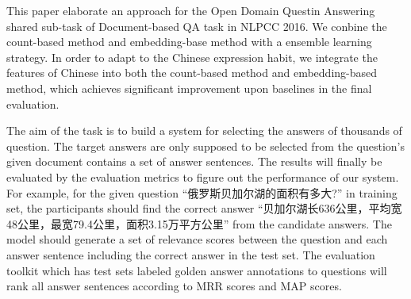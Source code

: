 \documentclass{llncs}
\begin{document}
This paper elaborate an approach for the Open Domain Questin Answering shared sub-task of Document-based QA task in NLPCC 2016. We conbine the count-based method and embedding-base method with a ensemble learning strategy. In order to adapt to the Chinese expression habit, we integrate the features of Chinese into both the count-based method and embedding-based method, which achieves significant improvement upon baselines in the final evaluation.









The aim of the task is to build a system for selecting the answers of thousands of question. The target answers are only supposed to be selected from the question's given document contains a set of answer sentences. 
The results will finally be evaluated by the evaluation metrics to figure out the performance of our system. 
For example, for the given question ``俄罗斯贝加尔湖的面积有多大?'' in training set, the participants should find the correct answer ``贝加尔湖长636公里，平均宽48公里，最宽79.4公里，面积3.15万平方公里'' from the candidate answers. The model should generate a set of relevance scores between the question and each answer sentence including the correct answer in the test set. The evaluation toolkit which has test sets labeled golden answer annotations to questions will rank all answer sentences according to MRR scores and MAP scores. 

\end{document}
